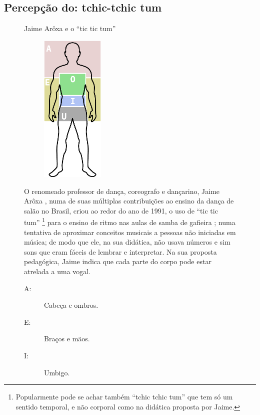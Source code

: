 \subsection{Percepção do: tchic-tchic tum}
\begin{figure}
\begin{elaboracion}{Jaime Arôxa e o ``tic tic tum''}
\begin{figure}
\centering
\includegraphics[width=0.33\textwidth]{chapters/cap-musicalidade-percepcion/aroxa-tic-tic-tum.eps}
\end{figure}
O renomeado professor de dança, coreografo e  dançarino, Jaime Arôxa \cite{JaimeAroxaSite},
numa de suas múltiplas contribuições ao ensino da dança de salão no Brasil,
criou ao redor do ano de 1991, 
o uso de ``tic tic tum''
\footnote{Popularmente pode se achar também ``tchic tchic tum'' que tem só um sentido temporal, 
e não corporal como na didática proposta por Jaime.} 
para o ensino de ritmo nas aulas de samba de gafieira \cite{EntrevistaJaimeAroxa1};
numa tentativa de aproximar conceitos musicais a pessoas não iniciadas em música;
de modo que ele, na sua didática, não usava números e sim sons que eram fáceis de lembrar e interpretar.
Na sua proposta pedagógica, 
Jaime indica que cada parte do corpo pode estar atrelada a uma vogal.
\begin{description} 
\item[A:] Cabeça e ombros. 
\item[E:] Braços e mãos. 
\item[I:] Umbigo.

\end{description}
\end{elaboracion}
\end{figure}
